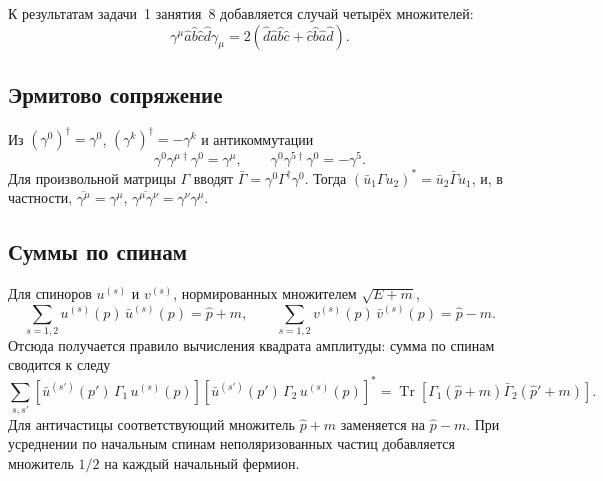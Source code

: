 \documentclass[../final.tex]{subfiles}
\begin{document}
К результатам задачи~1 занятия~8 добавляется
случай четырёх множителей:
\begin{equation*}
    \gamma^\mu\hat a\hat b\hat c\hat d\gamma_\mu
    =2\left(\hat d\hat a\hat b\hat c+\hat c\hat b\hat a\hat d\right).
\end{equation*}

\subsection*{Эрмитово сопряжение}

Из $(\gamma^0)^\dagger=\gamma^0$, $(\gamma^k)^\dagger=-\gamma^k$ и антикоммутации
\begin{equation*}
    \gamma^0\gamma^{\mu\dagger}\gamma^0=\gamma^\mu,
    \qquad
    \gamma^0\gamma^{5\dagger}\gamma^0=-\gamma^5.
\end{equation*}
Для произвольной матрицы $\Gamma$ вводят $\bar\Gamma=\gamma^0\Gamma^\dagger\gamma^0$.
Тогда $\left(\bar u_1\Gamma u_2\right)^*=\bar u_2\bar\Gamma u_1$,
и, в частности, $\overline{\gamma^\mu}=\gamma^\mu$,
$\overline{\gamma^\mu\gamma^\nu}=\gamma^\nu\gamma^\mu$.

\subsection*{Суммы по спинам}

Для спиноров $u^{(s)}$ и $v^{(s)}$, нормированных множителем $\sqrt{E+m}$,
\begin{equation*}
    \sum_{s=1,2}u^{(s)}(p)\,\bar u^{(s)}(p)=\hat p+m,
    \qquad
    \sum_{s=1,2}v^{(s)}(p)\,\bar v^{(s)}(p)=\hat p-m.
\end{equation*}
Отсюда получается правило вычисления квадрата амплитуды:
сумма по спинам сводится к следу
\begin{equation*}
    \sum_{s,s'}\left[\bar u^{(s')}(p')\,\Gamma_1\,u^{(s)}(p)\right]
    \left[\bar u^{(s')}(p')\,\Gamma_2\,u^{(s)}(p)\right]^*
    =\operatorname{Tr}\left[\Gamma_1(\hat p+m)\bar\Gamma_2(\hat p'+m)\right].
\end{equation*}
Для античастицы соответствующий множитель $\hat p+m$ заменяется на $\hat p-m$.
При усреднении по начальным спинам неполяризованных частиц добавляется множитель
$1/2$ на каждый начальный фермион.
\end{document}
